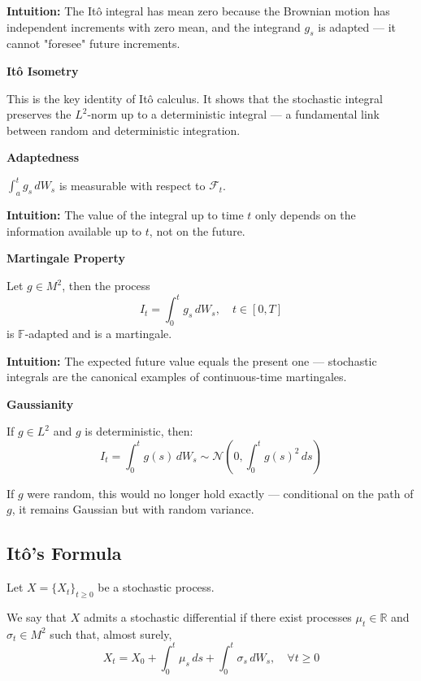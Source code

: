 \documentclass[12pt,a4paper]{article}
\theoremstyle{definition}
\begin{document}
\textbf{Intuition:} The Itô integral has mean zero because the Brownian motion has independent increments with zero mean, and the integrand $g_s$ is adapted — it cannot "foresee" future increments.

\textbf{Itô Isometry}
\begin{center}
\end{center}

This is the key identity of Itô calculus. It shows that the stochastic integral preserves the $L^2$-norm up to a deterministic integral — a fundamental link between random and deterministic integration.

\textbf{Adaptedness}

$\int_a^t g_s \, dW_s$ is measurable with respect to $\mathcal{F}_t$.

\textbf{Intuition:} The value of the integral up to time $t$ only depends on the information available up to $t$, not on the future.

\textbf{Martingale Property}

Let $g \in M^2$, then the process
\[
I_t = \int_0^t g_s \, dW_s, \quad t \in [0,T]
\]
is $\mathbb{F}$-adapted and is a martingale.

\textbf{Intuition:} The expected future value equals the present one — stochastic integrals are the canonical examples of continuous-time martingales.

\textbf{Gaussianity}

If $g \in L^2$ and $g$ is deterministic, then:
\[
I_t = \int_0^t g(s) \, dW_s \sim \mathcal{N}\left(0, \int_0^t g(s)^2 \, ds\right)
\]

If $g$ were random, this would no longer hold exactly — conditional on the path of $g$, it remains Gaussian but with random variance.

\subsection{Itô's Formula}

Let $X = \{X_t\}_{t \geq 0}$ be a stochastic process.

We say that $X$ admits a stochastic differential if there exist processes $\mu_t \in \mathbb{R}$ and $\sigma_t \in M^2$ such that, almost surely,
\[
X_t = X_0 + \int_0^t \mu_s \, ds + \int_0^t \sigma_s \, dW_s, \quad \forall t \geq 0
\]
\end{document}
